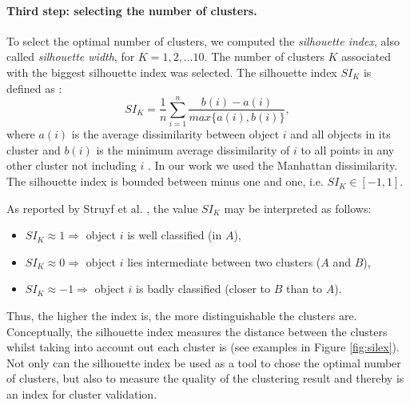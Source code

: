 \paragraph{Third step: selecting the number of clusters.}
To select the optimal number of clusters, we computed the \emph{silhouette index}, also called \emph{silhouette width}, for $K=1,2,\dots 10$. The number of clusters $K$ associated with the biggest silhouette index was selected. The silhouette index $SI_K$ is defined as \cite{kaufman_finding_1990}:
\begin{equation*}
SI_K = \frac{1}{n} \sum_{i=1}^n \frac{b(i)-a(i)}{max\{a(i),b(i)\}},
\end{equation*}
where $a(i)$ is the average dissimilarity between object $i$ and all objects in its cluster and $b(i)$ is the minimum average dissimilarity of $i$ to all points in any other cluster not including $i$ \cite{hennig_handbook_2016}. In our work we used the Manhattan dissimilarity. The silhouette index is bounded between minus one and one, i.e. $SI_K \in [-1,1]$.

\newpage

As reported by Struyf et al. \cite{JSSv001i04}, the value $SI_K$ may be interpreted as follows:

\begin{displayquote}
\begin{itemize}
\item $SI_K \approx 1 \Rightarrow$ object $i$ is well classified (in $A$),
\item $SI_K \approx 0 \Rightarrow$ object $i$ lies intermediate between two clusters ($A$ and $B$),
\item $SI_K \approx -1 \Rightarrow$ object $i$ is badly classified (closer to $B$ than to $A$).
\end{itemize}
\end{displayquote}

Thus, the higher the index is, the more distinguishable the clusters are. Conceptually, the silhouette index measures the distance between the clusters whilst taking into account out each cluster is (see examples in Figure \ref{fig:silex}). Not only can the silhouette index be used as a tool to chose the optimal number of clusters, but also to measure the quality of the clustering result and thereby is an index for cluster validation.

